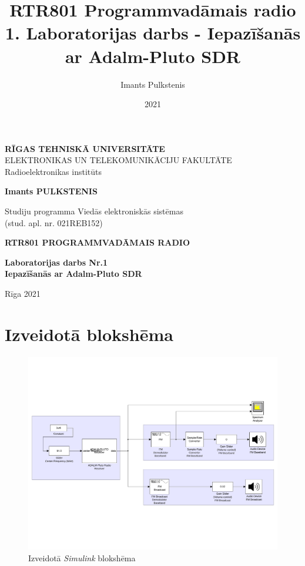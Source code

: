 \documentclass[a4paper,12pt]{extarticle}    %
\author{Imants Pulkstenis}
\title{RTR801 Programmvadāmais radio 1. Laboratorijas darbs - Iepazīšanās ar Adalm-Pluto SDR}
\date{2021}
\begin{document}
\begin{titlepage}
	\centering
	{ \normalsize \textbf{\uppercase{Rīgas  Tehniskā  Universitāte} }\\
	 \uppercase{Elektronikas un Telekomunikāciju fakultāte}\\
	 Radioelektronikas institūts
	 \par}
	\vspace{3cm}
	{\Large \textbf{Imants PULKSTENIS}\par}

	{\large Studiju programma Viedās elektroniskās sistēmas\\}
	{\Large (stud. apl. nr. 021REB152)\\}
	\vspace{3cm}
	{\Large \textbf{ \uppercase{RTR801 Programmvadāmais radio}}\par}
	{\large \textbf{Laboratorijas darbs Nr.1}\\}
	{\large \textbf{Iepazīšanās ar Adalm-Pluto SDR}\\}
	\vfill
	
	\vfill

	{\begin{center}
		\large Rīga 2021
	\end{center} }
\end{titlepage}
%
\section{Izveidotā blokshēma}
%
\begin{figure}[H]
  	 \centering
  		\includegraphics[trim={0cm 5cm 0cm 5cm},clip, angle=0, width=0.99\linewidth ]{pictures/lab1.pdf}
  		\caption{Izveidotā \textit{Simulink} blokshēma}\label{fig:blokshama}
\end{figure}
%
\end{document}
